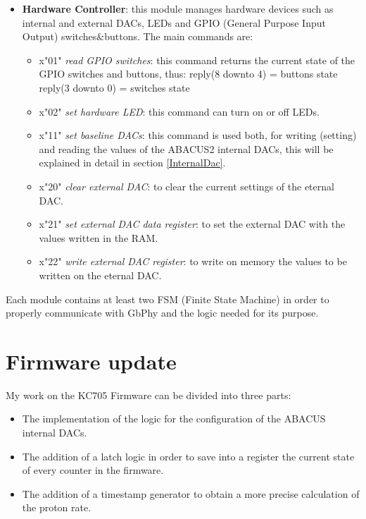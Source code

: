 \begin{itemize}
	\item \textbf{Hardware Controller}: this module manages hardware devices such as internal and external DACs, LEDs and GPIO (General Purpose Input Output) switches\&buttons. The main commands are:
	\begin{itemize}
		\item x"01" \textit{read GPIO switches}: this command returns the current state of the GPIO switches and buttons, thus:
		\newline
		reply(8 downto 4) = buttons state
		\newline
		reply(3 downto 0) = switches state
		\item x"02" \textit{set hardware LED}: this command can turn on or off LEDs.
		\item x"11" \textit{set baseline DACs}: this command is used both, for writing (setting) and reading the values of the ABACUS2 internal DACs, this will be explained in detail in section \ref{InternalDac}.
		\item x"20" \textit{clear external DAC}: to clear the current settings of the eternal DAC. 
		\item x"21" \textit{set external DAC data register}: to set the external DAC with the values written in the RAM.
		\item x"22" \textit{write external DAC register}: to write on memory the values to be written on the eternal DAC.
	\end{itemize}  
		
\end{itemize}
\noindent Each module contains at least two FSM (Finite State Machine) in order to properly communicate with GbPhy and the logic needed for its purpose. 

\section{Firmware update}
My work on the KC705 Firmware can be divided into three parts:
\begin{itemize}
	\item The implementation of the logic for the configuration of the ABACUS internal DACs. 
	\item The addition of a latch logic in order to save into a register the current state of every counter in the firmware.
	\item The addition of a timestamp generator to obtain a more precise calculation of the proton rate. 
\end{itemize}

